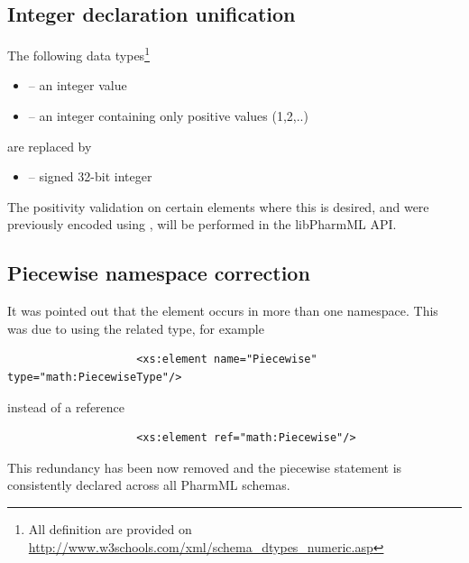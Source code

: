 \subsection{Integer declaration unification}

The following data types\footnote{All definition are provided on \url{http://www.w3schools.com/xml/schema_dtypes_numeric.asp}}
\begin{itemize}
\item 
{} -- an integer value
\item 
{} -- an integer containing only positive values (1,2,..)
\end{itemize}
are replaced by
\begin{itemize}
\item 
{} -- signed 32-bit integer
\end{itemize}
The positivity validation on certain elements where this is desired, and were
previously encoded using , will be performed in the libPharmML API.

\subsection{Piecewise namespace correction}
It was pointed out that the  element occurs in more 
than one namespace. This was due to using the related type, for example 
\lstset{language=XML}
\begin{lstlisting}
                    <xs:element name="Piecewise" type="math:PiecewiseType"/>
\end{lstlisting}
instead of a reference
\lstset{language=XML}
\begin{lstlisting}
                    <xs:element ref="math:Piecewise"/>
\end{lstlisting}
This redundancy has been now removed and the piecewise statement is consistently
declared across all PharmML schemas. 

